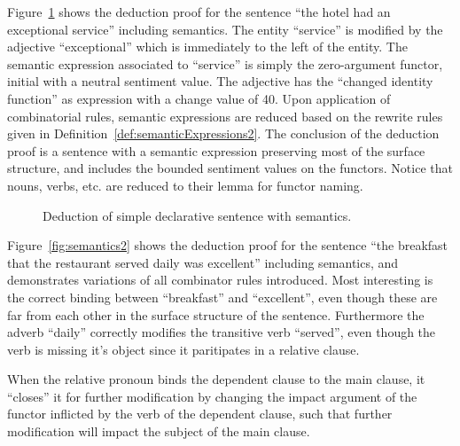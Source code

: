 \begin{example} 
Figure~\ref{fig:semantics} shows the deduction proof for the sentence ``the hotel had an exceptional service'' including semantics. The entity ``service'' is modified by the adjective ``exceptional'' which is immediately to the left of the entity. The semantic expression associated to ``service'' is simply the zero-argument functor, initial with a neutral sentiment value. The adjective has the ``changed identity function'' as expression with a change value of 40. Upon application of combinatorial rules, semantic expressions are reduced based on the rewrite rules given in Definition~\ref{def:semanticExpressions2}. The conclusion of the deduction proof is a sentence with a semantic expression preserving most of the surface structure, and includes the bounded sentiment values on the functors. Notice that nouns, verbs, etc. are reduced to their lemma for functor naming.

\begin{figure}[ht]
\center
{}
\caption{Deduction of simple declarative sentence with semantics.}
\label{fig:semantics}
\end{figure}
\label{ex:semantics}
\end{example}
\done

\begin{example} 
Figure~\ref{fig:semantics2} shows the deduction proof for the sentence ``the breakfast that the restaurant served daily was excellent'' including semantics, and demonstrates variations of all combinator rules introduced. Most interesting is the correct binding between ``breakfast'' and ``excellent'', even though these are far from each other in the surface structure of the sentence. Furthermore the adverb ``daily'' correctly modifies the transitive verb ``served'', even though the verb is missing it's object since it paritipates in a relative clause.

When the relative pronoun binds the dependent clause to the main clause, it ``closes'' it for further modification by changing the impact argument of the functor inflicted by the verb of the dependent clause, such that further modification will impact the subject of the main clause.


\label{ex:semantics2}
\done
\end{example}
\vspace{-1em}


